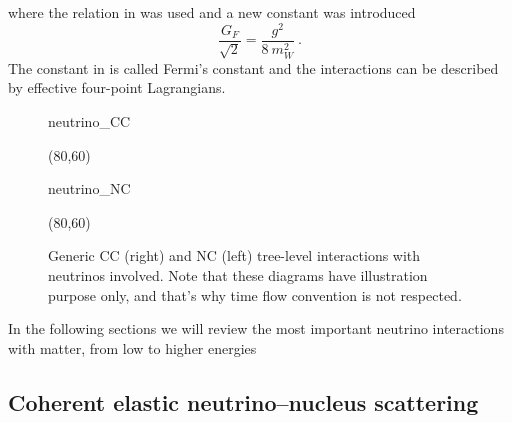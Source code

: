 where the relation in  was used and a new constant was introduced 
\begin{equation}
	\label{eq:fermi_const}
	\frac{G_F}{\sqrt{2}} = \frac{g^2}{8\ m_W^2}\ .
\end{equation}
The constant in  is called Fermi's constant and the interactions %
can be described by effective four-point Lagrangians.
						    
\begin{figure}
	\centering
	\medskip
	\begin{fmffile}{neutrino_CC}
		\begin{fmfgraph*}(80,60)
		\end{fmfgraph*}
	\end{fmffile}
	\qquad
	\raisebox{2.5em}{,}
	\qquad
	\begin{fmffile}{neutrino_NC}
		\begin{fmfgraph*}(80,60)
		\end{fmfgraph*}
	\end{fmffile}
	\bigskip
	\caption{Generic CC (right) and NC (left) tree-level interactions with neutrinos involved.
		Note that these diagrams have illustration purpose only, and that's why time flow convention is not respected. }
	\label{fig:neutrino_tree}
\end{figure}

In the following sections we will review the most important neutrino interactions with matter, %
from low to higher energies

\subsection{Coherent elastic neutrino--nucleus scattering}

